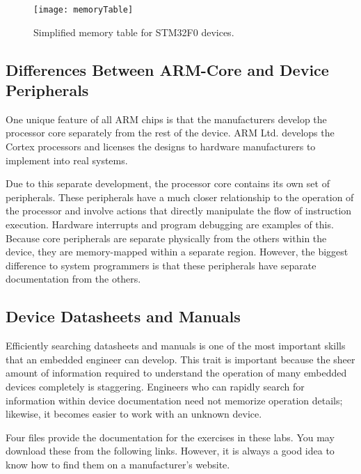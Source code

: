 \documentclass[openany,11pt,fleqn]{book} %
\begin{document}
\begin{figure}[]
    \centering\texttt{[image: memoryTable]}
    \caption{Simplified memory table for STM32F0 devices.}
    \label{memoryTable}
\end{figure}


\subsection{\color{orange}Differences Between ARM-Core and Device Peripherals}

One unique feature of all ARM chips is that the manufacturers develop the processor core separately from the rest of the device. ARM Ltd. develops the Cortex processors and licenses the designs to hardware manufacturers to implement into real systems. 

Due to this separate development, the processor core contains its own set of peripherals. These peripherals have a much closer relationship to the operation of the processor and involve actions that directly manipulate the flow of instruction execution. Hardware interrupts and program debugging are examples of this. Because core peripherals are separate physically from the others within the device, they are memory-mapped within a separate region. However, the biggest difference to system programmers is that these peripherals have separate documentation from the others.


\subsection{Device Datasheets and Manuals}

Efficiently searching datasheets and manuals is one of the most important skills that an embedded engineer can develop. This trait is important because the sheer amount of information required to understand the operation of many embedded devices completely is staggering. 
Engineers who can rapidly search for information within device documentation need not memorize operation details; likewise, it becomes easier to work with an unknown device. 

Four files provide the documentation for the exercises in these labs. You may download these from the following links. However, it is always a good idea to know how to find them on a manufacturer's website.
\end{document}
